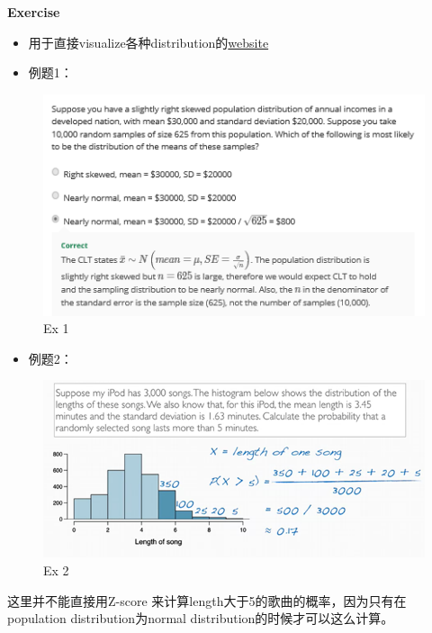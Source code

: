 \documentclass[]{book}
\providecommand{\tightlist}{%
  \setlength{\itemsep}{0pt}\setlength{\parskip}{0pt}}
\begin{document}
\textbf{Exercise}

\begin{itemize}
\tightlist
\item
  用于直接visualize各种distribution的\href{https://gallery.shinyapps.io/CLT_mean/}{website}
\item
  例题1：
\end{itemize}

\begin{figure}

{\centering \includegraphics[width=0.8\linewidth]{graphs/1-6} 

}

\caption{Ex 1}\label{fig:fig6}
\end{figure}

\begin{itemize}
\tightlist
\item
  例题2：
\end{itemize}

\begin{figure}

{\centering \includegraphics[width=0.8\linewidth]{graphs/1-7} 

}

\caption{Ex 2}\label{fig:fig7}
\end{figure}

这里并不能直接用Z-score
来计算length大于5的歌曲的概率，因为只有在population distribution为normal
distribution的时候才可以这么计算。
\end{document}
